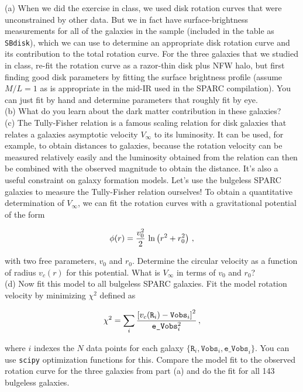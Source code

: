 \documentclass[12pt]{article}
\begin{document}
(a) When we did the exercise in class, we used disk rotation curves
that were unconstrained by other data. But we in fact have
surface-brightness measurements for all of the galaxies in the sample
(included in the table as \texttt{SBdisk}), which we can use to
determine an appropriate disk rotation curve and its contribution to
the total rotation curve. For the three galaxies that we studied in
class, re-fit the rotation curve as a razor-thin disk plus NFW halo,
but first finding good disk parameters by fitting the surface
brightness profile (assume $M/L = 1$ as is appropriate in the mid-IR
used in the SPARC compilation). You can just fit by hand and determine
parameters that roughly fit by eye.\\

(b) What do you learn about the dark matter contribution in these
galaxies?\\

(c) The Tully-Fisher relation is a famous scaling relation for disk
galaxies that relates a galaxies asymptotic velocity $V_\infty$ to its
luminosity. It can be used, for example, to obtain distances to
galaxies, because the rotation velocity can be measured relatively
easily and the luminosity obtained from the relation can then be
combined with the observed magnitude to obtain the distance. It's also
a useful constraint on galaxy formation models. Let's use the
bulgeless SPARC galaxies to measure the Tully-Fisher relation
ourselves! To obtain a quantitative determination of $V_\infty$, we can
fit the rotation curves with a gravitational potential of the form

\begin{equation}
  \phi(r) = {v_0^2\over 2}\,\ln\left(r^2 + r_0^2\right)\,,
\end{equation}

with two free parameters, $v_0$ and $r_0$. Determine the circular
velocity as a function of radius $v_c(r)$ for this potential. What is
$V_\infty$ in terms of $v_0$ and $r_0$?\\

(d) Now fit this model to all bulgeless SPARC galaxies. Fit the model rotation velocity by minimizing $\chi^2$ defined as

\begin{equation}
  \chi^2 = \sum_i {\left[v_c(\texttt{R}_i) - \texttt{Vobs}_i\right]^2 \over \texttt{e\_Vobs}_i^2}\,,
\end{equation}

where $i$ indexes the $N$ data points for each galaxy
$\{\texttt{R}_i,\texttt{Vobs}_i,\texttt{e\_Vobs}_i\}$. You can use
\texttt{scipy} optimization functions for this. Compare the model fit
to the observed rotation curve for the three galaxies from part (a)
and do the fit for all 143 bulgeless galaxies.\\
\end{document}
